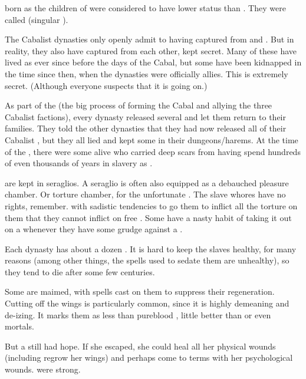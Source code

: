 \Resphain{} born as the children of \yurideth{} were considered to have lower status than \thelyadeth. They were called  (singular ). 

The Cabalist dynasties only openly admit to having \yurideth{} captured from \Kezerad{} and \Baelzerach. 
But in reality, they also have \yurideth{} captured from each other, kept secret. 
Many of these have lived as \yurideth{} ever since before the days of the Cabal, but some have been kidnapped in the time since then, when the dynasties were officially allies. This is extremely secret. 
(Although everyone suspects that it is going on.)

As part of the  (the big process of forming the Cabal and allying the three Cabalist factions), every dynasty released several \yurideth{} and let them return to their families. They told the other dynasties that they had now released all of their Cabalist \yurideth{}, but they all lied and kept some in their dungeons/harems.
At the time of the \thirdbanewar, there were some \resviel{} alive who carried deep scars from having spend hundreds of even thousands of years in slavery as \yurideth{}.

\Yurideth{} are kept in seraglios. A seraglio is often also equipped as a debauched pleasure chamber. Or torture chamber, for the unfortunate \yurid{}. The slave whores have no rights, remember. \Resphain{} with sadistic tendencies to go them to inflict all the torture on them that they cannot inflict on free \resviel{}. Some \resphain{} have a nasty habit of taking it out on a \yurid{} whenever they have some grudge against a \resvil{}.

Each dynasty has about a dozen \yurideth{}. It is hard to keep the slaves healthy, for many reasons (among other things, the spells used to sedate them are unhealthy), so they tend to die after some few centuries. 

Some \yurideth{} are maimed, with spells cast on them to suppress their regeneration. 
Cutting off the wings is particularly common, since it is highly demeaning and de-\resphan{}izing. It marks them as less than pureblood \resphain{}, little better than \bezedeth{} or even mortals.

But a \yurid{} still had hope. 
If she escaped, she could heal all her physical wounds (including regrow her wings) and perhaps come to terms with her psychological wounds. 
\Resviel{} were strong. 









